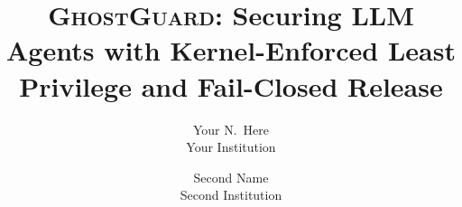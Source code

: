 \documentclass[letterpaper,twocolumn,10pt]{article}
\begin{document}
\date{}

\newcommand{\SystemName}{\textsc{GhostGuard}\xspace}

\newcommand{\FIXME}[1]{\textcolor{red}{#1}}
\newcommand{\FIXED}[1]{\textcolor{blue}{#1}}
\newcommand{\RY}[1]{\textcolor{purple}{#1}}

\title{\Large \bf \SystemName: Securing LLM Agents with Kernel-Enforced Least Privilege and Fail-Closed Release}

\author{
{\rm Your N.\ Here}\\
Your Institution
\and
{\rm Second Name}\\
Second Institution
} %


\maketitle








\appendix






\cleardoublepage


\end{document}
